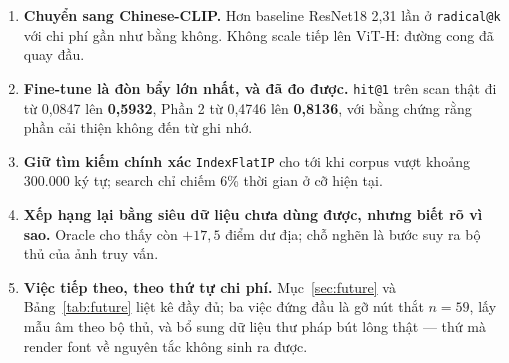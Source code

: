 \documentclass[conference,a4paper]{IEEEtran}
\newcommand{\code}[1]{{\small\texttt{#1}}}
\begin{document}
\begin{enumerate}
  \item \textbf{Chuyển sang Chinese-CLIP.} Hơn baseline ResNet18 2,31 lần ở \code{radical@k} với chi
        phí gần như bằng không. Không scale tiếp lên ViT-H: đường cong đã quay đầu.
  \item \textbf{Fine-tune là đòn bẩy lớn nhất, và đã đo được.} \code{hit@1} trên scan thật đi từ
        0,0847 lên \textbf{0,5932}, Phần 2 từ 0,4746 lên \textbf{0,8136}, với bằng chứng rằng phần
        cải thiện không đến từ ghi nhớ.
  \item \textbf{Giữ tìm kiếm chính xác} \code{IndexFlatIP} cho tới khi corpus vượt khoảng 300.000
        ký tự; search chỉ chiếm 6\% thời gian ở cỡ hiện tại.
  \item \textbf{Xếp hạng lại bằng siêu dữ liệu chưa dùng được, nhưng biết rõ vì sao.} Oracle cho thấy
        còn $+17{,}5$ điểm dư địa; chỗ nghẽn là bước suy ra bộ thủ của ảnh truy vấn.
  \item \textbf{Việc tiếp theo, theo thứ tự chi phí.} Mục~\ref{sec:future} và Bảng~\ref{tab:future}
        liệt kê đầy đủ; ba việc đứng đầu là gỡ nút thắt $n = 59$, lấy mẫu âm theo bộ thủ, và bổ sung
        dữ liệu thư pháp bút lông thật --- thứ mà render font về nguyên tắc không sinh ra được.
\end{enumerate}
\end{document}
